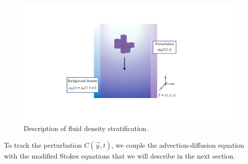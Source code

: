 \begin{figure}[ht]
	\begin{center}
	\includegraphics[scale=0.4]{./figures/fig_stratification_schematics}
	\caption{Description of fluid density stratification.}
	\label{fig_stratification_schematics}
	\end{center}
\end{figure}
To track the perturbation $C(\vec{y},t)$, we couple the advection-diffusion equation with the modified Stokes equations that we will describe in the next section. 
